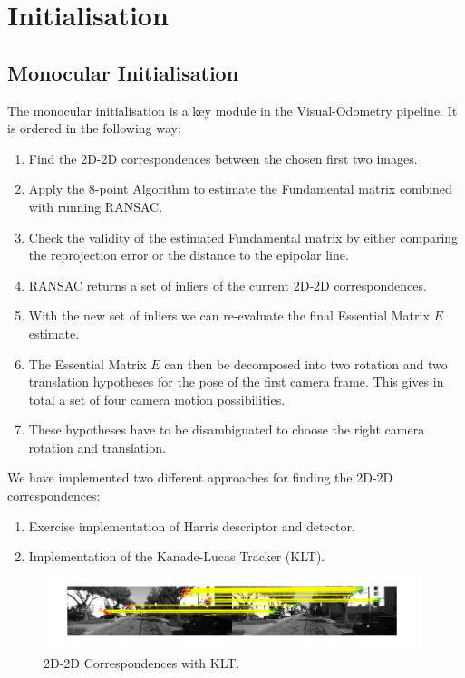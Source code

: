 \section{Initialisation}
\label{s:Initialisation}

\subsection{Monocular Initialisation}
The monocular initialisation is a key module in the Visual-Odometry pipeline.
It is ordered in the following way:
\begin{enumerate}
	\item Find the 2D-2D correspondences between the chosen first two images.
	\item Apply the 8-point Algorithm to estimate the Fundamental matrix combined with running RANSAC.
	\item Check the validity of the estimated Fundamental matrix by either comparing the reprojection error or the distance to the epipolar line. 
	\item RANSAC returns a set of inliers of the current 2D-2D correspondences.
	\item With the new set of inliers we can re-evaluate the final Essential Matrix $E$ estimate.
	\item The Essential Matrix $E$ can then be decomposed into two rotation and two translation hypotheses for the pose of the first camera frame. This gives in total a set of four camera motion possibilities.
	\item These hypotheses have to be disambiguated to choose the right camera rotation and translation.
\end{enumerate}

\newpage
We have implemented two different approaches for finding the 2D-2D correspondences:

\begin{enumerate}
	\item Exercise implementation of Harris descriptor and detector.
	\item Implementation of the Kanade-Lucas Tracker (KLT).
\end{enumerate}

\begin{figure}
\includegraphics[width=0.98\textwidth]{files/KLT_2d2d.jpg}
\caption[2D-2D Correspondences with KLT]{\label{fig:KLT_2d2d}2D-2D Correspondences with KLT.}
\end{figure}

